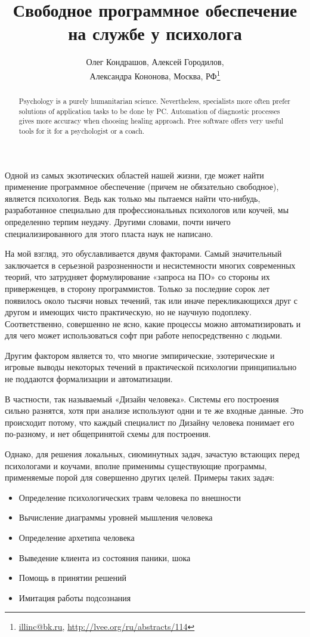 \documentclass[10pt, a5paper]{article}
\begin{document}
\title{Свободное программное обеспечение на службе у психолога}
\author{Олег Кондрашов, Алексей Городилов,\\ Александра Кононова, Москва, РФ\footnote{\url{illinc@bk.ru}, \url{http://lvee.org/ru/abstracts/114}}}
\maketitle
\begin{abstract}
Psychology is a purely humanitarian science. Nevertheless, \linebreak specialists more often prefer solutions of application tasks to be done by PC. Automation of diagnostic processes gives more accuracy when choosing healing approach. Free software offers very useful tools for it for a psychologist or a coach.
\end{abstract}
Одной из самых экзотических областей нашей жизни, где может найти применение программное обеспечение (причем не обязательно свободное), является психология. Ведь как только мы пытаемся найти что-нибудь, разработанное специально для профессиональных психологов или коучей, мы определенно терпим неудачу. Другими словами, почти ничего специализированного для этого пласта наук не написано.

На мой взгляд, это обуславливается двумя факторами. Самый значительный заключается в серьезной разрозненности и несистемности многих современных теорий, что затрудняет формулирование «запроса на ПО» со стороны их приверженцев, в сторону программистов. Только за последние сорок лет появилось около тысячи новых течений, так или иначе перекликающихся друг с другом и имеющих чисто практическую, но не научную подоплеку. Соответственно, совершенно не ясно, какие процессы можно автоматизировать и для чего может использоваться софт при работе непосредственно с людьми.

Другим фактором является то, что многие эмпирические, эзотерические и игровые выводы некоторых течений в практической психологии принципиально не поддаются формализации и автоматизации.

В частности, так называемый «Дизайн человека». Системы его построения сильно разнятся, хотя при анализе используют одни и те же входные данные. Это происходит потому, что каждый специалист по Дизайну человека понимает его по-разному, и нет общепринятой схемы для построения.

Однако, для решения локальных, сиюминутных задач, зачастую встающих перед психологами и коучами, вполне применимы существующие программы, применяемые порой для совершенно других целей. Примеры таких задач:
\begin{itemize}
 \item	Определение психологических травм человека по внешности
 \item	Вычисление диаграммы уровней мышления человека
 \item	Определение архетипа человека
 \item	Выведение клиента из состояния паники, шока
 \item	Помощь в принятии решений
 \item	Имитация работы подсознания
\end{itemize}
\end{document}
